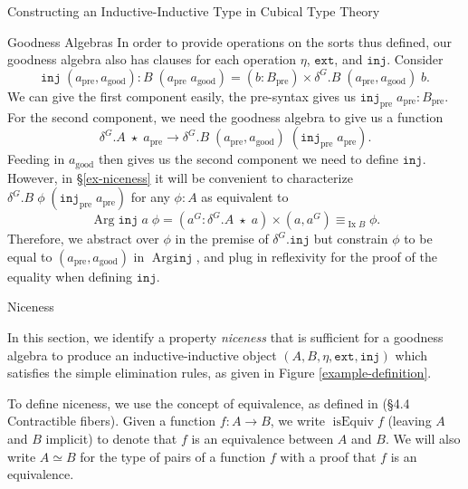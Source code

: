 \documentclass[runningheads]{llncs}
\newcommand{\erase}[1]{{}}
\DeclareMathOperator{\USet}{Type}
\DeclareMathOperator{\isEquiv}{isEquiv}
\DeclareMathOperator{\Arg}{Arg}
\DeclareMathOperator{\Ix}{Ix}
\newcommand{\pre}[1]{{#1}_\text{pre}}
\newcommand{\good}[1]{{#1}_\text{good}}
\newcommand{\Id}[2]{{#1}\equiv{#2}}
\newcommand{\IdA}[3]{{#1}\equiv_{#3}{#2}}
\newcommand{\join}{\texttt{ext}}
\newcommand{\inj}{\texttt{inj}}
\begin{document}
\begin{section}{Constructing an Inductive-Inductive Type in Cubical Type Theory}
\begin{subsection}{Goodness Algebras}
{In order to provide operations on the sorts thus defined, our goodness algebra also has clauses for each operation $\eta$, $\join$, and $\inj$. Consider \[\inj\;(\pre{a}, \good{a}) : B\;(\pre{a}\;\good{a}) = (b : \pre{B}) \times \delta^G.B\;(\pre{a}, \good{a})\;b.\] We can give the first component easily, the pre-syntax gives us $\pre{\inj}\;\pre{a} : \pre{B}$. For the second component, we need the goodness algebra to give us a function \[\delta^G.A\;\star\;\pre{a} \to \delta^G.B\;(\pre{a}, \good{a})\;(\pre{\inj}\;\pre{a}).\] Feeding in $\good{a}$ then gives us the second component we need to define $\inj$. However, in \S\ref{ex-niceness} it will be convenient to characterize $\delta^G.B\;\phi\;(\pre{\inj}\;\pre{a})$ for any $\phi : A$ as equivalent to \[\Arg \inj\;a\;\phi = (a^G : \delta^G.A\;\star\;a) \times \IdA{(a , a^G)}{\phi}{\Ix B}.\] Therefore, we abstract over $\phi$ in the premise of $\delta^G.\inj$ but constrain $\phi$ to be equal to $(\pre{a}, \good{a})$ in $\Arg\inj$, and plug in reflexivity for the proof of the equality when defining $\inj$.
}

\end{subsection}

\begin{subsection}{Niceness}\label{ex-niceness}

In this section, we identify a property \emph{niceness} that is sufficient for a goodness algebra to produce an inductive-inductive object $(A, B, \eta, \join, \inj)$ which satisfies the simple elimination rules, as given in Figure \ref{example-definition}.

To define niceness, we use the concept of equivalence, as defined in \citet{hottbook} (\S4.4 Contractible fibers). Given a function $f : A \to B$, we write $\isEquiv f$ (leaving $A$ and $B$ implicit) to denote that $f$ is an equivalence between $A$ and $B$. We will also write $A \simeq B$ for the type of pairs of a function $f$ with a proof that $f$ is an equivalence.

\erase{
\begin{lemma}[\label{equiv-pullback}Pullback over equivalence.]
    If $f$ is an equivalence between $A$ and $B$, $P : B \to \USet$ is a predicate on $B$, and we know $h : (a : A) \to P\;(f\;a)$, then there is a function $p : (b : B) \to P\;b$ such that $\Id{p\;(f\;a)}{h\;a}$ for all $a$.
\end{lemma}
\begin{proof}
    Immediate from the definition of equivalences as functions with contractible fibers.
\end{proof}

}
\end{subsection}
\end{section}
\end{document}
